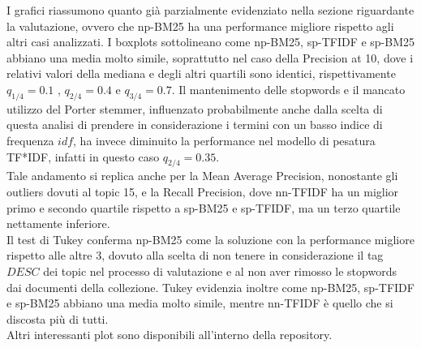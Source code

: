 \documentclass[a4paper, 11pt]{article}
\begin{document}
\noindent
I grafici riassumono quanto già parzialmente evidenziato nella sezione riguardante la valutazione, ovvero che np-BM25 ha una performance migliore rispetto agli altri casi analizzati. I boxplots sottolineano come np-BM25, sp-TFIDF e sp-BM25 abbiano una media molto simile, soprattutto nel caso della Precision at 10, dove i relativi valori della mediana e degli altri quartili sono identici, rispettivamente $q_{1/4}=0.1$ , $q_{2/4}=0.4$ e $q_{3/4}=0.7$. Il mantenimento delle stopwords e il mancato utilizzo del Porter stemmer, influenzato probabilmente anche dalla scelta di questa analisi di prendere in considerazione i termini con un basso indice di frequenza $idf$, ha invece diminuito la performance nel modello di pesatura TF*IDF, infatti in questo caso $q_{2/4}=0.35$.\\
Tale andamento si replica anche per la Mean Average Precision, nonostante gli outliers dovuti al topic 15, e la Recall Precision, dove nn-TFIDF ha un miglior primo e secondo quartile rispetto a sp-BM25 e sp-TFIDF, ma un terzo quartile nettamente inferiore.\\
Il test di Tukey conferma np-BM25 come la soluzione con la performance migliore rispetto alle altre 3, dovuto alla scelta di non tenere in considerazione il tag $DESC$ dei topic nel processo di valutazione e al non aver rimosso le stopwords dai documenti della collezione. Tukey evidenzia inoltre come np-BM25, sp-TFIDF e sp-BM25 abbiano una media molto simile, mentre nn-TFIDF è quello che si discosta più di tutti.\\
Altri interessanti plot sono disponibili all'interno della repository.
\end{document}
